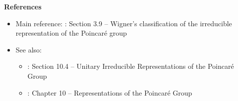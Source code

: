 
\vskip 0.5cm
\noindent
\textbf{References}
\begin{itemize}
\item
	Main reference:
	\vskip 0.1cm
	\cite{Sternberg1994}: Section 3.9 -- Wigner's classification of the irreducible representation of the Poincaré group
\item
	See also:
	\begin{itemize}
	\item
		\cite{Tung1985}: Section 10.4 -- Unitary Irreducible Representations of the Poincaré Group
	\item
		\cite{Jones2020}: Chapter 10 -- Representations of the Poincaré Group
	\end{itemize}
\end{itemize}

